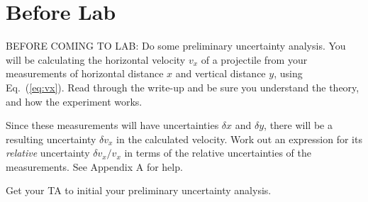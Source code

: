 \newexp

\section*{Before Lab}

BEFORE COMING TO LAB: Do some preliminary uncertainty analysis.  You
will be calculating the horizontal velocity $v_{x}$ of a
projectile from your measurements
of horizontal distance $x$ and vertical distance $y$, using
Eq.~(\ref{eq:vx}).  Read through the write-up and be sure you
understand the theory, and how the experiment works.

Since these measurements will
have uncertainties $\delta x$ and $\delta y$, there will be a
resulting
uncertainty $\delta v_{x}$ in the calculated velocity.  Work out an
expression for its {\em relative} uncertainty $\delta v_{x}/v_{x}$
in terms of the relative uncertainties of the measurements.  See Appendix
A for help.

 Get your TA to initial your preliminary uncertainty
analysis.


